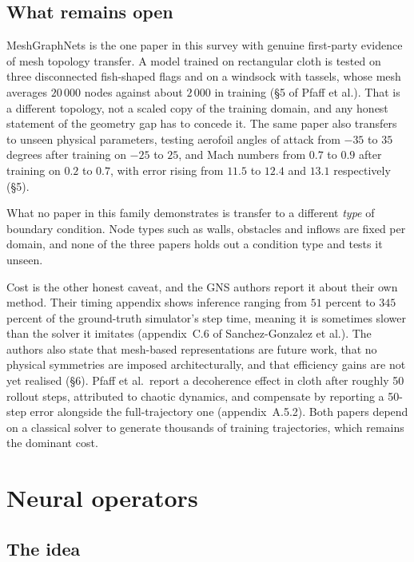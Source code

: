 \documentclass[11pt, a4paper]{article}
\begin{document}
\subsection{What remains open}

MeshGraphNets is the one paper in this survey with genuine first-party
evidence of mesh topology transfer. A model trained on rectangular cloth is
tested on three disconnected fish-shaped flags and on a windsock with
tassels, whose mesh averages $20\,000$ nodes against about $2\,000$ in
training (\S{}5 of Pfaff et al.). That is a different topology, not a scaled copy
of the training domain, and any honest statement of the geometry gap has to
concede it. The same paper also transfers to unseen physical parameters,
testing aerofoil angles of attack from $-35$ to $35$ degrees after training on
$-25$ to $25$, and Mach numbers from $0.7$ to $0.9$ after training on $0.2$ to
$0.7$, with error rising from $11.5$ to $12.4$ and $13.1$ respectively (\S{}5).

What no paper in this family demonstrates is transfer to a different
\emph{type} of boundary condition. Node types such as walls, obstacles and
inflows are fixed per domain, and none of the three papers holds out a
condition type and tests it unseen.

Cost is the other honest caveat, and the GNS authors report it about their
own method. Their timing appendix shows inference ranging from $51$ percent to $345$ percent of
the ground-truth simulator's step time, meaning it is sometimes slower than
the solver it imitates (appendix~C.6 of Sanchez-Gonzalez et al.). The
authors also state that mesh-based representations are future work, that no
physical symmetries are imposed architecturally, and that efficiency gains
are not yet realised (\S{}6). Pfaff et al.\ report a decoherence effect in cloth
after roughly 50 rollout steps, attributed to chaotic dynamics, and
compensate by reporting a 50-step error alongside the full-trajectory one
(appendix~A.5.2). Both papers depend on a classical solver to generate
thousands of training trajectories, which remains the dominant cost.

\section{Neural operators}
\label{sec:operators}

\subsection{The idea}
\end{document}
